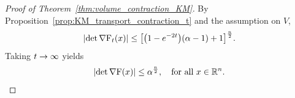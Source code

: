 \documentclass[10pt]{amsart}
\theoremstyle{definition}\newtheorem{defi}[theo]{Definition}\newtheorem{rema}[theo]{Remark}\newtheorem{exam}[theo]{Example}\newtheorem{exem}[theo]{Example}\newtheorem{nota}[theo]{Notation}
\newcommand{\R}{\mathbb R}
\newcommand{\KM}{\mathrm F}
\newcommand{\V}{V}
\newcommand{\dd}{n}
\newcommand{\lsh}{\alpha}
\renewcommand*{\to}{\mathchoice{\longrightarrow}{\rightarrow}{\rightarrow}{\rightarrow}}
\let\originalleft\left
\let\originalright\right
\renewcommand{\left}{\mathopen{}\mathclose\bgroup\originalleft}
\renewcommand{\right}{\aftergroup\egroup\originalright}
\let\oldin\in
\renewcommand{\in}{\mathchoice{\oldin}{\oldin}{\,\oldin\,}{\,\oldin\,}}
\begin{document}
\begin{proof}[Proof of Theorem~\ref{thm:volume_contraction_KM}]
By Proposition~\ref{prop:KM_transport_contraction_t} and the assumption on $\V$,
\begin{equation}\label{eq:det_Ft_est}
\lvert\det\nabla\KM_t(x)|\le\left[\left(1-e^{-2t}\right)(\lsh-1)+1\right]^{\frac{\dd}{2}}.
\end{equation}
Taking $t\to\infty$ yields
\[
\lvert\det\nabla\KM(x)|\le\lsh^{\frac{\dd}{2}}, \quad \text{for all }x\in \R^{\dd}.\qedhere
\]
\end{proof}


\appendix
\section{}\label{sec:appendix}
\end{document}
